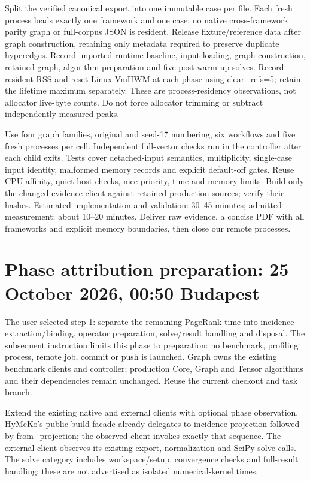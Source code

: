 \documentclass[10pt,a4paper]{article}
\begin{document}
Split the verified canonical export into one immutable case per file. Each fresh
process loads exactly one framework and one case; no native cross-framework parity
graph or full-corpus JSON is resident. Release fixture/reference data after graph
construction, retaining only metadata required to preserve duplicate hyperedges.
Record imported-runtime baseline, input loading, graph construction, retained graph,
algorithm preparation and five post-warm-up solves. Record resident RSS and reset
Linux VmHWM at each phase using clear\_refs=5; retain the lifetime maximum separately.
These are process-residency observations, not allocator live-byte counts. Do not
force allocator trimming or subtract independently measured peaks.

Use four graph families, original and seed-17 numbering, six workflows and five
fresh processes per cell. Independent full-vector checks run in the controller
after each child exits. Tests cover detached-input semantics, multiplicity,
single-case input identity, malformed memory records and explicit default-off gates.
Reuse CPU affinity, quiet-host checks, nice priority, time and memory limits.
Build only the changed evidence client against retained production sources; verify
their hashes. Estimated implementation and validation: 30--45 minutes; admitted
measurement: about 10--20 minutes. Deliver raw evidence, a concise PDF with all
frameworks and explicit memory boundaries, then close our remote processes.
\section*{Phase attribution preparation: 25 October 2026, 00:50 Budapest}
The user selected step 1: separate the remaining PageRank time into incidence
extraction/binding, operator preparation, solve/result handling and disposal.
The subsequent instruction limits this phase to preparation: no benchmark,
profiling process, remote job, commit or push is launched. Graph owns the existing
benchmark clients and controller; production Core, Graph and Tensor algorithms
and their dependencies remain unchanged. Reuse the current checkout and task branch.

Extend the existing native and external clients with optional phase observation.
HyMeKo's public build facade already delegates to incidence projection followed
by from\_projection; the observed client invokes exactly that sequence. The external
client observes its existing export, normalization and SciPy solve calls.
The solve category includes workspace/setup, convergence checks and full-result
handling; these are not advertised as isolated numerical-kernel times.
\end{document}
